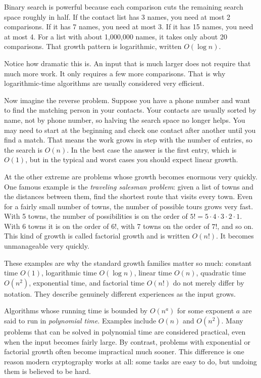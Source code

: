 \documentclass[11pt,oneside]{book}
\theoremstyle{definition}
\begin{document}
Binary search is powerful because each comparison cuts the remaining search space roughly in half.
If the contact list has 3 names, you need at most 2 comparisons.
If it has 7 names, you need at most 3.
If it has 15 names, you need at most 4.
For a list with about 1,000,000 names, it takes only about 20 comparisons.
That growth pattern is logarithmic, written $O(\log n)$.

Notice how dramatic this is.
An input that is much larger does not require that much more work.
It only requires a few more comparisons.
That is why logarithmic-time algorithms are usually considered very efficient.

Now imagine the reverse problem.
Suppose you have a phone number and want to find the matching person in your contacts.
Your contacts are usually sorted by name, not by phone number, so halving the search space no longer helps.
You may need to start at the beginning and check one contact after another until you find a match.
That means the work grows in step with the number of entries, so the search is $O(n)$.
In the best case the answer is the first entry, which is $O(1)$, but in the typical and worst cases you should expect linear growth.

At the other extreme are problems whose growth becomes enormous very quickly.
One famous example is the \emph{traveling salesman problem}: given a list of towns and the distances between them, find the shortest route that visits every town.
Even for a fairly small number of towns, the number of possible tours grows very fast.
With 5 towns, the number of possibilities is on the order of $5! = 5 \cdot 4 \cdot 3 \cdot 2 \cdot 1$.
With 6 towns it is on the order of $6!$, with 7 towns on the order of $7!$, and so on.
This kind of growth is called factorial growth and is written $O(n!)$.
It becomes unmanageable very quickly.

These examples are why the standard growth families matter so much:
constant time $O(1)$, logarithmic time $O(\log n)$, linear time $O(n)$, quadratic time $O(n^{2})$, exponential time, and factorial time $O(n!)$ do not merely differ by notation.
They describe genuinely different experiences as the input grows.

Algorithms whose running time is bounded by $O(n^{a})$ for some exponent $a$ are said to run in \emph{polynomial time}.
Examples include $O(n)$ and $O(n^{2})$.
Many problems that can be solved in polynomial time are considered practical, even when the input becomes fairly large.
By contrast, problems with exponential or factorial growth often become impractical much sooner.
This difference is one reason modern cryptography works at all: some tasks are easy to do, but undoing them is believed to be hard.
\end{document}
